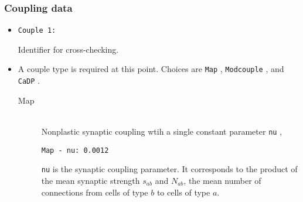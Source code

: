 \documentclass[12pt,a4paper]{article}
\newcommand{\type}[1]{ {\small\small\tt #1} }
\begin{document}
\subsubsection{Coupling data}
\label{sec:couple}

\begin{itemize}

	\item
	\begin{lstlisting}
Couple 1:
	\end{lstlisting}
	Identifier for cross-checking.
	\item A couple type is required at this point. Choices are \type{Map}, \type{Modcouple}, and \type{CaDP}.

\begin{description}

	\item[Map]\ \\
	Nonplastic synaptic coupling wtih a single constant parameter \type{nu},
	\begin{lstlisting}
Map - nu: 0.0012
	\end{lstlisting}
	\type{nu} is the synaptic coupling parameter. It corresponds to the product of the mean synaptic strength $s_{ab}$ and $N_{ab}$, the mean number of connections from cells of type $b$ to cells of type $a$.





\end{description}
\end{itemize}
\end{document}
